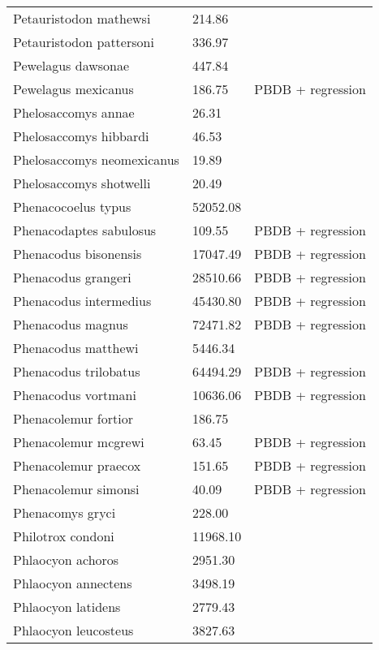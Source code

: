 \begin{center}
\begin{longtable}{p{} p{} p{} }
  Petauristodon mathewsi & 214.86 & \cite{Tomiya2013} \\ 
  Petauristodon pattersoni & 336.97 & \cite{Tomiya2013} \\ 
  Pewelagus dawsonae & 447.84 & \cite{Jepsen1932} \\ 
  Pewelagus mexicanus & 186.75 & PBDB + regression \\ 
  Phelosaccomys annae & 26.31 & \cite{Tomiya2013} \\ 
  Phelosaccomys hibbardi & 46.53 & \cite{Tomiya2013} \\ 
  Phelosaccomys neomexicanus & 19.89 & \cite{Tomiya2013} \\ 
  Phelosaccomys shotwelli & 20.49 & \cite{Tomiya2013} \\ 
  Phenacocoelus typus & 52052.08 & \cite{Tomiya2013} \\ 
  Phenacodaptes sabulosus & 109.55 & PBDB + regression \\ 
  Phenacodus bisonensis & 17047.49 & PBDB + regression \\ 
  Phenacodus grangeri & 28510.66 & PBDB + regression \\ 
  Phenacodus intermedius & 45430.80 & PBDB + regression \\ 
  Phenacodus magnus & 72471.82 & PBDB + regression \\ 
  Phenacodus matthewi & 5446.34 & \cite{Cope1871} \\ 
  Phenacodus trilobatus & 64494.29 & PBDB + regression \\ 
  Phenacodus vortmani & 10636.06 & PBDB + regression \\ 
  Phenacolemur fortior & 186.75 & \cite{Wood1962} \\ 
  Phenacolemur mcgrewi & 63.45 & PBDB + regression \\ 
  Phenacolemur praecox & 151.65 & PBDB + regression \\ 
  Phenacolemur simonsi & 40.09 & PBDB + regression \\ 
  Phenacomys gryci & 228.00 & \cite{McKenna2011} \\ 
  Philotrox condoni & 11968.10 & \cite{Tomiya2013} \\ 
  Phlaocyon achoros & 2951.30 & \cite{Tomiya2013} \\ 
  Phlaocyon annectens & 3498.19 & \cite{Tomiya2013} \\ 
  Phlaocyon latidens & 2779.43 & \cite{Tomiya2013} \\ 
  Phlaocyon leucosteus & 3827.63 & \cite{Tomiya2013} \\ 

\end{longtable}
\end{center}

